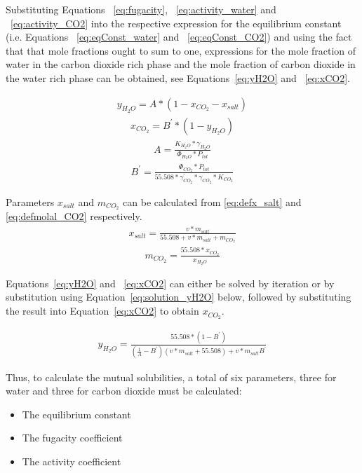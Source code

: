 Substituting Equations ~\eqref{eq:fugacity}, ~\eqref{eq:activity_water} and ~\eqref{eq:activity_CO2} into the respective expression for the equilibrium constant (i.e. Equations ~\eqref{eq:eqConst_water} and ~\eqref{eq:eqConst_CO2}) and using the fact that that mole fractions ought to sum to one, expressions for the mole fraction of water in the carbon dioxide rich phase and the mole fraction of carbon dioxide in the water rich phase can be obtained, see Equations~\eqref{eq:yH2O} and ~\eqref{eq:xCO2}.

\begin{align} 
    y_{H_2 O} = A*(1 - x_{CO_2} - x_{salt}) \label{eq:yH2O}
\end{align}
\begin{align} 
    x_{CO_2} = B^{'} * (1 - y_{H_2 O}) \label{eq:xCO2}
\end{align}
\begin{align} 
    A = \frac{K_{H_2 O} * \gamma_{H_2 O}}{\Phi_{H_2 O} * P_{tot}} \label{eq:defA}
\end{align}
\begin{align} 
    B^{'}= \frac{\Phi_{CO_2} * P_{tot}}{55.508*\gamma_{CO_2}^{'}* \gamma_{CO_2} * K_{CO_2}} \label{eq:defBdash}
\end{align}

Parameters \(x_{salt}\) and \(m_{CO_2}\) can be calculated from \eqref{eq:defx_salt} and \eqref{eq:defmolal_CO2} respectively.
\begin{align} 
    x_{salt}= \frac{v*m_{salt}}{55.508 + v*m_{salt}+m_{CO_2}} \label{eq:defx_salt}
\end{align}
\begin{align} 
    m_{CO_2} = \frac{55.508 * x_{CO_2}}{x_{H_2 O}}  \label{eq:defmolal_CO2}
\end{align}

Equations~\eqref{eq:yH2O} and ~\eqref{eq:xCO2} can either be solved by iteration or by substitution using Equation~\eqref{eq:solution_yH2O} below, followed by substituting the result into Equation~\eqref{eq:xCO2} to obtain \(x_{CO_2}\).

\begin{align} 
    y_{H_2 O}=\frac{55.508*(1-B^{'})}{(\frac{1}{A} - B^{'} )(v*m_{salt} + 55.508) + v*m_{salt} B^{'}}  \label{eq:solution_yH2O}
\end{align}

Thus, to calculate the mutual solubilities, a total of six parameters, three for water and three for carbon dioxide must be calculated:

\begin{itemize}
    \item The equilibrium constant
    \item The fugacity coefficient
    \item The activity coefficient
\end{itemize}

